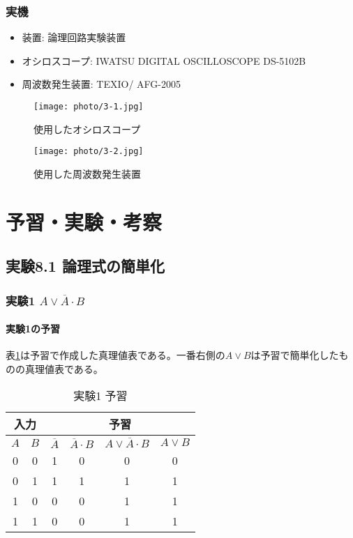 \documentclass[dvipdfmx]{jsarticle}
\begin{document}
\subsubsection*{実機}
\begin{itemize}
  \item 装置: 論理回路実験装置
  \item オシロスコープ: IWATSU DIGITAL OSCILLOSCOPE DS-5102B
  \item 周波数発生装置: TEXIO/ AFG-2005
\end{itemize}

\begin{figure}[hbtp]
  \centering
  \begin{minipage}{0.5\columnwidth}
    \centering
    \texttt{[image: photo/3-1.jpg]}
    \label{fig:3-1}
    \caption{使用したオシロスコープ}
  \end{minipage}
  \begin{minipage}{0.4\columnwidth}
    \centering
    \texttt{[image: photo/3-2.jpg]}
    \caption{使用した周波数発生装置}
    \label{fig:3-2}
  \end{minipage}
\end{figure}



\section{予習・実験・考察}

\subsection{実験8.1 論理式の簡単化}

\subsubsection{実験1 $A\vee\overline{A}\cdot B$}

\paragraph{実験1の予習}
表\ref*{tb:4-1}は予習で作成した真理値表である。一番右側の$A \vee B$は予習で簡単化したものの真理値表である。
\begin{table}[hbtp]
  \caption{実験1 予習}
  \centering
  \begin{tabular}{|c|c||c|c|c|c|} \hline
    \multicolumn{2}{|c||}{入力} & \multicolumn{4}{c|}{予習} \\ \hline
    $A$ & $B$ & $\overline{A}$ & $\overline{A} \cdot B$ & $A \vee \overline{A} \cdot B$ & $A \vee B$\\ \hline
    0 & 0 & 1 & 0 & 0 & 0\\ \hline
    0 & 1 & 1 & 1 & 1 & 1\\ \hline
    1 & 0 & 0 & 0 & 1 & 1\\ \hline
    1 & 1 & 0 & 0 & 1 & 1\\ \hline
  \end{tabular}
  \label{tb:4-1}
\end{table}\\
\end{document}
